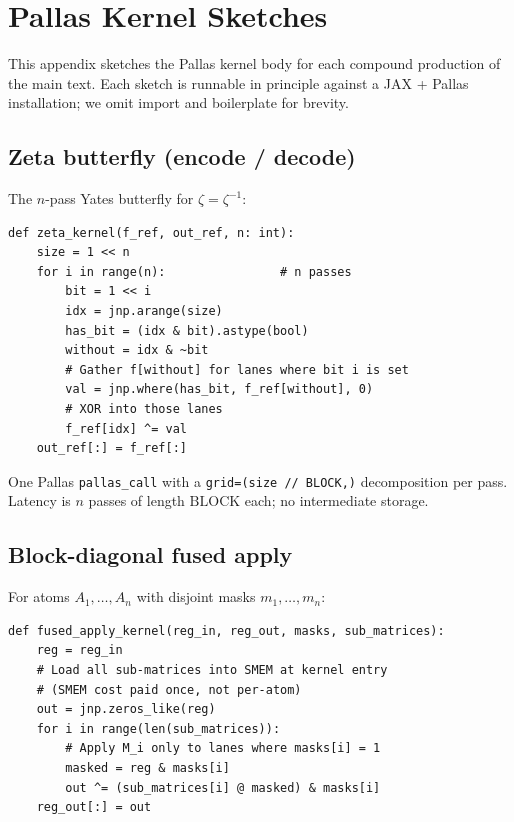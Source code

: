 \section{Pallas Kernel Sketches}\label{app:kernels}

This appendix sketches the Pallas kernel body for
each compound production of the main text. Each
sketch is runnable in principle against a JAX +
Pallas installation; we omit import and
boilerplate for brevity.

\subsection{Zeta butterfly (encode / decode)}

The $n$-pass Yates butterfly for $\zeta = \zeta^{-1}$:

\begin{lstlisting}
def zeta_kernel(f_ref, out_ref, n: int):
    size = 1 << n
    for i in range(n):                # n passes
        bit = 1 << i
        idx = jnp.arange(size)
        has_bit = (idx & bit).astype(bool)
        without = idx & ~bit
        # Gather f[without] for lanes where bit i is set
        val = jnp.where(has_bit, f_ref[without], 0)
        # XOR into those lanes
        f_ref[idx] ^= val
    out_ref[:] = f_ref[:]
\end{lstlisting}

One Pallas \texttt{pallas\_call} with a
\texttt{grid=(size // BLOCK,)} decomposition per
pass. Latency is $n$ passes of length
$\mathrm{BLOCK}$ each; no intermediate storage.

\subsection{Block-diagonal fused apply}

For atoms $A_1, \ldots, A_n$ with disjoint masks
$m_1, \ldots, m_n$:

\begin{lstlisting}
def fused_apply_kernel(reg_in, reg_out, masks, sub_matrices):
    reg = reg_in
    # Load all sub-matrices into SMEM at kernel entry
    # (SMEM cost paid once, not per-atom)
    out = jnp.zeros_like(reg)
    for i in range(len(sub_matrices)):
        # Apply M_i only to lanes where masks[i] = 1
        masked = reg & masks[i]
        out ^= (sub_matrices[i] @ masked) & masks[i]
    reg_out[:] = out
\end{lstlisting}

